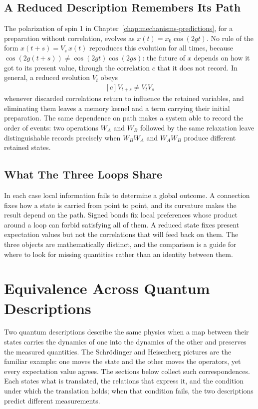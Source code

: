 \documentclass[11pt,oneside]{book}
\newenvironment{centeredalign}{\[\begin{gathered}[c]}{\end{gathered}\]}
\begin{document}
\section{A Reduced Description Remembers Its Path}
The polarization of spin 1 in Chapter~\ref{chap:mechanisms-predictions}, for a preparation without correlation,
evolves as \(x(t)=x_0\cos(2gt)\). No rule of the form \(x(t+s)=V_s\,x(t)\) reproduces this evolution for all times,
because \(\cos(2g(t+s))\ne\cos(2gt)\cos(2gs)\): the future of \(x\) depends on how it got to its present value, through
the correlation \(c\) that it does not record. In general, a reduced evolution \(V_t\) obeys
\begin{centeredalign}
V_{t+s}\ne V_tV_s
\end{centeredalign}
whenever discarded correlations return to influence the retained variables, and eliminating them leaves a memory kernel
and a term carrying their initial preparation. The same dependence on path makes a system able to record the order of
events: two operations \(W_A\) and \(W_B\) followed by the same relaxation leave distinguishable records precisely when
\(W_BW_A\) and \(W_AW_B\) produce different retained states.

\section{What The Three Loops Share}
In each case local information fails to determine a global outcome. A connection fixes how a state is carried from point
to point, and its curvature makes the result depend on the path. Signed bonds fix local preferences whose product around
a loop can forbid satisfying all of them. A reduced state fixes present expectation values but not the correlations that
will feed back on them. The three objects are mathematically distinct, and the comparison is a guide for where to look
for missing quantities rather than an identity between them.


\chapter{Equivalence Across Quantum Descriptions}

Two quantum descriptions describe the same physics when a map between their states carries the dynamics of one into the
dynamics of the other and preserves the measured quantities. The Schr\"odinger and Heisenberg pictures are the familiar
example: one moves the state and the other moves the operators, yet every expectation value agrees. The sections below
collect such correspondences. Each states what is translated, the relations that express it, and the condition under
which the translation holds; when that condition fails, the two descriptions predict different measurements.
\end{document}
